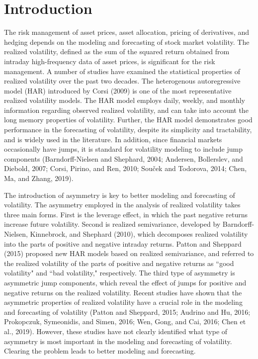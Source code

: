 \documentclass[10pt]{article}
\begin{document}
\section{Introduction}
The risk management of asset prices, asset allocation, pricing of derivatives, and hedging depends on the modeling and forecasting of stock market volatility. 
The realized volatility, defined as the sum of the squared return obtained from intraday high-frequency data of asset prices, is significant for the risk management. 
A number of studies have examined the statistical properties of realized volatility over the past two decades.  
The heterogenous autoregressive model (HAR) introduced by Corsi (2009) is one of the most representative realized volatility models. 
The HAR model employs daily, weekly, and monthly information regarding observed realized volatility, and can take into account the long memory properties of volatility. 
Further, the HAR model demonstrates good performance in the forecasting of volatility, despite its simplicity and tractability, and is widely used in the literature. 
In addition, since financial markets occasionally have jumps, 
it is standard for volatility modeling to include jump components (Barndorff-Nielsen and Shephard, 2004; Andersen, Bollerslev, and Diebold, 2007; Corsi, Pirino, and Ren, 2010; 
Sou\v{c}ek and Todorova, 2014; Chen, Ma, and Zhang, 2019).  

The introduction of asymmetry is key to better modeling and forecasting of volatility.
The asymmetry employed in the analysis of realized volatility takes three main forms. 
First is the leverage effect, in which the past negative returns increase future volatility. 
Second is realized semivariance, developed by Barndorff-Nielsen, Kinnebrock, and Shephard (2010), which 
decomposes realized volatility into the parts of positive and negative intraday returns.
Patton and Sheppard (2015) proposed new HAR models based on realized semivariance, and 
referred to the realized volatility of the parts of positive and negative returns as ``good volatility" and ``bad volatility," respectively. 
The third type of asymmetry is asymmetric jump components, which 
reveal the effect of jumps for positive and negative returns on the realized volatility. 
Recent studies have shown that the asymmetric properties of realized volatility have a crucial role in the modeling and forecasting of volatility (Patton and Sheppard, 2015; Audrino and Hu, 2016; Prokopczuk, Symeonidis, and Simen, 2016;
Wen, Gong, and Cai, 2016; Chen et al., 2019). 
However, these studies have not clearly identified what type of asymmetry is most important in the modeling and forecasting of volatility. 
Clearing the problem leads to better modeling and forecasting. 
\end{document}
